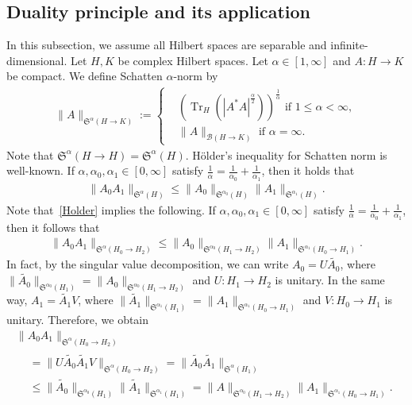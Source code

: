\documentclass[AHL,Unicode,longabstracts,MathTools,published]{cedram}
\newcommand{\CB}{\mathcal{B}}
\newcommand{\FS}{\mathfrak{S}}
\newcommand{\al}{\alpha}
\newcommand{\wt}{\widetilde}
\newcommand{\K}[1]{\left(#1\right)}
\newcommand{\I}{\infty}
\DeclareMathOperator{\Tr}{Tr}
\begin{document}
\subsection{Duality principle and its application} 
In this subsection, we assume all Hilbert spaces are separable and infinite-dimen\-sional. Let $H, K$ be complex Hilbert spaces. Let $\al \in [1,\I]$ and $A: H \to K$ be compact. We define Schatten $\al$-norm by
\begin{align}
\|A\|_{\FS^\al(H\to K)} :=
\begin{cases}
&\K{\Tr_H\left(|A^*A|^{\frac{\al}{2}}\right)}^{\frac{1}{\al}} \text{ if } 1 \le \al <\I,\\
&\|A\|_{\CB(H \to K)} \text{ if } \al = \I.
\end{cases}
\end{align}
Note that $\FS^\al(H \to H)=\FS^\al(H)$. H\"older's inequality for Schatten norm is well-known. If $\al, \al_0, \al_1 \in [0,\I]$ satisfy $\frac{1}{\al}=\frac{1}{\al_0}+\frac{1}{\al_1}$, then it holds that
\begin{align}\label{Holder}
\|A_0 A_1\|_{\FS^{\al}(H)} \le \|A_0\|_{\FS^{\al_0}(H)} \|A_1\|_{\FS^{\al_1}(H)}.
\end{align}
Note that~\eqref{Holder} implies the following. If $\al, \al_0, \al_1 \in [0,\I]$ satisfy $\frac{1}{\al}=\frac{1}{\al_0}+\frac{1}{\al_1}$, then it follows that
\begin{align}\label{g Holder}
\|A_0 A_1\|_{\FS^{\al}(H_0\to H_2)} \le \|A_0\|_{\FS^{\al_0}(H_1 \to H_2)} \|A_1\|_{\FS^{\al_1}(H_0 \to H_1)}.
\end{align}
In fact, by the singular value decomposition, we can write $A_0 = U \wt{A_0}$, where $\|\wt{A_0}\|_{\FS^{\al_0}(H_1)} = \|A_0\|_{\FS^{\al_0}(H_1 \to H_2)}$ and $U:H_1 \to H_2$ is unitary. In the same way, $A_1 = \wt{A_1} V$, where $\|\wt{A_1}\|_{\FS^{\al_1}(H_1)} = \|A_1\|_{\FS^{\al_1}(H_0 \to H_1)}$ and $V:H_0 \to H_1$ is unitary. Therefore, we obtain
\begin{multline}
\|A_0 A_1\|_{\FS^\al(H_0 \to H_2)}\\
\begin{aligned}
 &= \|U \wt{A_0} \wt{A_1} V\|_{\FS^\al(H_0 \to H_2)} = \|\wt{A_0} \wt{A_1}\|_{\FS^\al(H_1)} \\
&\le \|\wt{A_0}\|_{\FS^{\al_0}(H_1)} \|\wt{A_1}\|_{\FS^{\al_1}(H_1)} = \|A\|_{\FS^{\al_0}(H_1 \to H_2)} \|A_1\|_{\FS^{\al_1}(H_0 \to H_1)}.
\end{aligned}
\end{multline}
\end{document}
